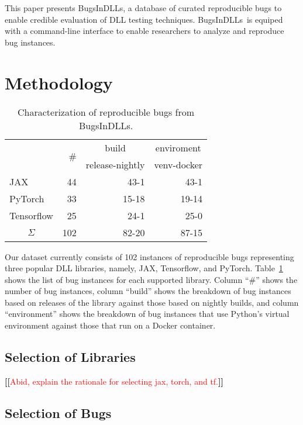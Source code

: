 \documentclass[sigconf]{acmart}
\newcommand{\Fix}[1]{\textbf{[[}\textcolor{red}{#1}\textbf{]]}}
\newcommand{\tname}{BugsInDLLs}
\newcommand{\jax}{JAX}
\newcommand{\torch}{PyTorch}
\newcommand{\tf}{Tensorflow}
\newcommand{\numbugs}{102}
\begin{document}
This paper presents \tname, a database of curated reproducible bugs to
enable credible evaluation of DLL testing techniques. \tname\ is
equiped with a command-line interface to enable researchers to analyze
and reproduce bug instances.


\section{Methodology}

\begin{table}
  \centering
  \label{table:bug-characterization}
  \caption{Characterization of reproducible bugs from \tname.}
\begin{tabular}{lrrr}
  \toprule
  & \multirow{2}{*}{\#} &  \multicolumn{1}{c}{build}          &   \multicolumn{1}{c}{enviroment}  \\
  &   & release-nightly &  venv-docker  \\
  \cmidrule(lr){2-4}
  \jax{} & 44 & 43-1 &  43-1 \\
  \torch{} & 33 & 15-18 & 19-14 \\
  \tf{} & 25 & 24-1 & 25-0 \\
  \midrule
  \multicolumn{1}{c}{$\Sigma$} & \numbugs{} & 82-20 & 87-15 \\
  \bottomrule
\end{tabular}
\end{table}


Our dataset currently consists of \numbugs{} instances of reproducible
bugs representing three popular DLL libraries, namely, \jax, \tf, and
\torch. Table~\ref{table:bug-characterization} shows the list of bug
instances for each supported library. Column ``\#'' shows the number
of bug instances, column ``build'' shows the breakdown of bug
instances based on releases of the library against those based on
nightly builds, and column ``environment'' shows the breakdown of bug
instances that use Python's virtual environment against those that run
on a Docker container.

\subsection{Selection of Libraries}

\Fix{Abid, explain the rationale for selecting jax, torch, and tf.}

\subsection{Selection of Bugs}
\end{document}
